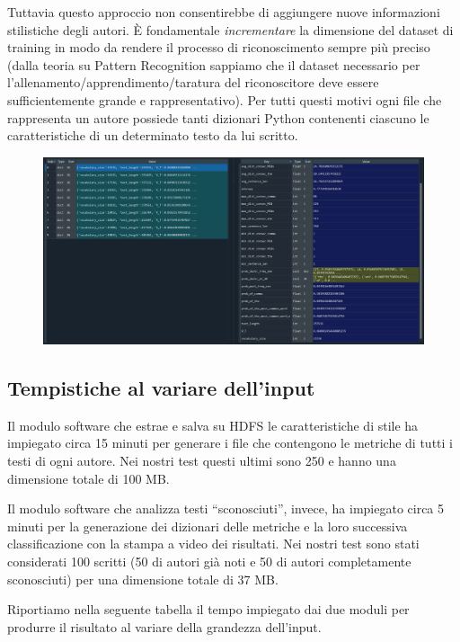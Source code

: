 \documentclass[titlepage]{article}
\begin{document}
Tuttavia questo approccio non consentirebbe di aggiungere nuove informazioni stilistiche degli autori. \`{E} fondamentale \textit{incrementare} la dimensione del dataset di training in modo da rendere il processo di riconoscimento sempre più preciso (dalla teoria su Pattern Recognition sappiamo che il dataset necessario per l'allenamento/apprendimento/taratura del riconoscitore deve essere sufficientemente grande e rappresentativo). Per tutti questi motivi ogni file che rappresenta un autore possiede tanti dizionari Python contenenti ciascuno le caratteristiche di un determinato testo da lui scritto.
\begin{figure}[htp]
	\centering
	\includegraphics[width=\textwidth, height=\textheight, keepaspectratio]{metriche.png}
\end{figure}

\subsection{Tempistiche al variare dell'input}
Il modulo software che estrae e salva su HDFS le caratteristiche di stile ha impiegato circa 15 minuti per generare i file che contengono le metriche di tutti i testi di ogni autore. Nei nostri test questi ultimi sono 250 e hanno una dimensione totale di 100 MB.

Il modulo software che analizza testi ``sconosciuti'', invece, ha impiegato circa 5 minuti per la generazione dei dizionari delle metriche e la loro successiva classificazione con la stampa a video dei risultati. Nei nostri test sono stati considerati 100 scritti (50 di autori già noti e 50 di autori completamente sconosciuti) per una dimensione totale di 37 MB.

Riportiamo nella seguente tabella il tempo impiegato dai due moduli per produrre il risultato al variare della grandezza dell'input.
\end{document}

